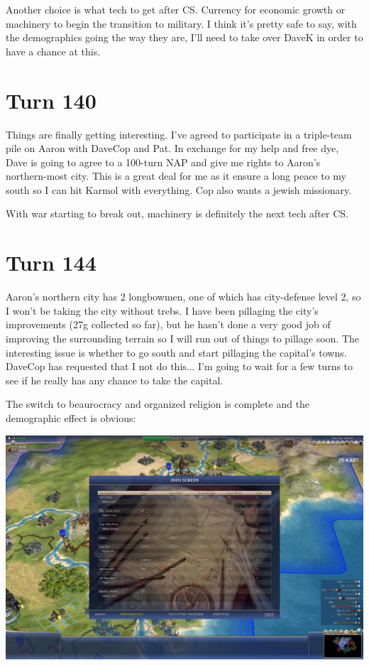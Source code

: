\documentclass[10pt]{article}
\begin{document}
Another choice is what tech to get after CS. Currency for economic
growth or machinery to begin the transition to military. I think it's
pretty safe to say, with the demographics going the way they are, I'll
need to take over DaveK in order to have a chance at this.

\section*{Turn 140}

Things are finally getting interesting. I've agreed to participate in
a triple-team pile on Aaron with DaveCop and Pat. In exchange for my
help and free dye, Dave is going to agree to a 100-turn NAP and give
me rights to Aaron's northern-most city. This is a great deal for me
as it ensure a long peace to my south so I can hit Karmol with
everything. Cop also wants a jewish missionary.

With war starting to break out, machinery is definitely the next tech after CS.

\section*{Turn 144}

Aaron's northern city has 2 longbowmen, one of which has city-defense
level 2, so I won't be taking the city without trebs. I have been
pillaging the city's improvements (27g collected so far), but he
hasn't done a very good job of improving the surrounding terrain so I
will run out of things to pillage soon. The interesting issue is
whether to go south and start pillaging the capital's towns. DaveCop
has requested that I not do this... I'm going to wait for a few turns
to see if he really has any chance to take the capital.

The switch to beaurocracy and organized religion is complete and the demographic effect is obvious:

\includegraphics[width=1.0\textwidth]{turn144}
\end{document}
